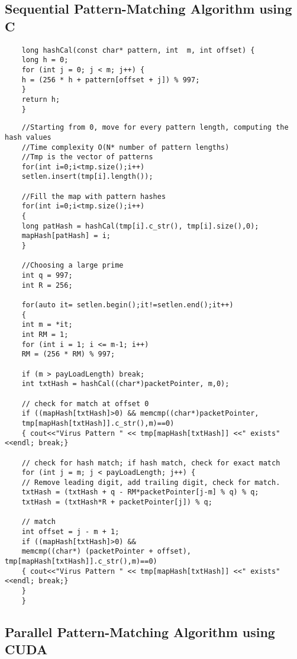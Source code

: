 \subsection{Sequential Pattern-Matching Algorithm using C}
	\begin{lstlisting}
	long hashCal(const char* pattern, int  m, int offset) {
	long h = 0;
	for (int j = 0; j < m; j++) {
	h = (256 * h + pattern[offset + j]) % 997;
	}
	return h;
	}
	\end{lstlisting}


	\begin{lstlisting}
	//Starting from 0, move for every pattern length, computing the hash values
	//Time complexity O(N* number of pattern lengths)
	//Tmp is the vector of patterns
	for(int i=0;i<tmp.size();i++)
	setlen.insert(tmp[i].length());
	
	//Fill the map with pattern hashes
	for(int i=0;i<tmp.size();i++)
	{
	long patHash = hashCal(tmp[i].c_str(), tmp[i].size(),0);
	mapHash[patHash] = i;
	}
	
	//Choosing a large prime
	int q = 997; 
	int R = 256;
	
	for(auto it= setlen.begin();it!=setlen.end();it++)
	{
	int m = *it;
	int RM = 1;
	for (int i = 1; i <= m-1; i++)
	RM = (256 * RM) % 997;
	
	if (m > payLoadLength) break;
	int txtHash = hashCal((char*)packetPointer, m,0);
	
	// check for match at offset 0
	if ((mapHash[txtHash]>0) && memcmp((char*)packetPointer,
	tmp[mapHash[txtHash]].c_str(),m)==0)
	{ cout<<"Virus Pattern " << tmp[mapHash[txtHash]] <<" exists"<<endl; break;}
	
	// check for hash match; if hash match, check for exact match
	for (int j = m; j < payLoadLength; j++) {
	// Remove leading digit, add trailing digit, check for match.
	txtHash = (txtHash + q - RM*packetPointer[j-m] % q) % q;
	txtHash = (txtHash*R + packetPointer[j]) % q;
	
	// match
	int offset = j - m + 1;
	if ((mapHash[txtHash]>0) &&
	memcmp((char*) (packetPointer + offset), tmp[mapHash[txtHash]].c_str(),m)==0)
	{ cout<<"Virus Pattern " << tmp[mapHash[txtHash]] <<" exists"<<endl; break;}
	}
	}
	\end{lstlisting}
\vspace{\topsep}
\subsection{Parallel Pattern-Matching Algorithm using CUDA}

